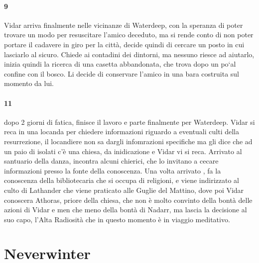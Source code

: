 \documentclass{article}
\begin{document}
                  \paragraph{9} Vidar arriva finalmente nelle vicinanze di Waterdeep, con la speranza di poter trovare un modo per resuscitare l'amico deceduto, ma si rende conto di non poter portare il cadavere in giro per la città, decide quindi di cercare un posto in cui lasciarlo al sicuro. Chiede ai contadini dei dintorni, ma nessuno riesce ad aiutarlo, inizia quindi la ricerca di una casetta abbandonata, che trova dopo un po`al confine con il bosco. Li decide di conservare l'amico in una bara costruita sul momento da lui. 
                  \paragraph{11} dopo 2 giorni di fatica, finisce il lavoro e parte finalmente per Waterdeep. Vidar si reca in una locanda per chiedere informazioni riguardo a eventuali culti della resurrezione, il locandiere non sa dargli infomrazioni specifiche ma gli dice che ad un paio di isolati c'è una chiesa, da inidicazione e Vidar vi si reca. Arrivato al santuario della danza, incontra alcuni chierici, che lo invitano a cecare informazioni presso la fonte della conoscenza. Una volta arrivato , fa la conoscenza della bibliotecaria che si occupa di religioni, e viene indirizzato al culto di Lathander che viene praticato alle Guglie del Mattino, dove poi Vidar conoscera Athoras, priore della chiesa, che non è molto convinto della bontà delle azioni di Vidar e men che meno della bontà di Nadarr, ma lascia la decisione al suo capo, l'Alta Radiosità che in questo momento è in viaggio meditativo. 




\section{Neverwinter}
\end{document}
